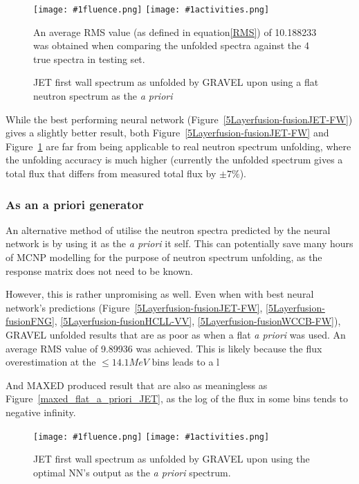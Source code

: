 \documentclass[a4paper, 12pt]{article}
\newcommand{\fluenceandactivities}[1]{
\texttt{[image: \#1fluence.png]}
\texttt{[image: \#1activities.png]}
}
\begin{document}
\begin{figure}
\centering
    \fluenceandactivities{/home/ocean/Documents/GitHubDir/unfolding/unfolding/unfoldingsuite/neuralnetwork/realinputEarlyStopping/comparison/real_fusion_test_gravel_test_001_}
    \caption{JET first wall spectrum as unfolded by GRAVEL upon using a flat neutron spectrum as the \emph{a priori}}\label{gravel_flat_a_priori_JET}
    An average RMS value (as defined in equation\ref{RMS}) of 10.188233 was obtained when comparing the unfolded spectra against the 4 true spectra in testing set.
\end{figure}

While the best performing neural network (Figure~\ref{5Layerfusion-fusionJET-FW}) gives a slightly better result, both Figure~\ref{5Layerfusion-fusionJET-FW} and Figure~\ref{gravel_flat_a_priori_JET} are far from being applicable to real neutron spectrum unfolding, where the unfolding accuracy is much higher (currently the unfolded spectrum gives a total flux that differs from measured total flux by $\pm 7\%$\cite{bethColling_TBMD}).

\subsubsection{As an a priori generator}
An alternative method of utilise the neutron spectra predicted by the neural network is by using it as the \emph{a priori} it self. This can potentially save many hours of MCNP modelling for the purpose of neutron spectrum unfolding, as the response matrix does not need to be known.

However, this is rather unpromising as well. Even when with best neural network's predictions (Figure~\ref{5Layerfusion-fusionJET-FW}, \ref{5Layerfusion-fusionFNG}, \ref{5Layerfusion-fusionHCLL-VV}, \ref{5Layerfusion-fusionWCCB-FW}), GRAVEL unfolded results that are as poor as when a flat \emph{a priori} was used. An average RMS value of 9.89936 was achieved. This is likely because the flux overestimation at the $\le 14.1MeV$ bins leads to a l

And MAXED produced result that are also as meaningless as Figure~\ref{maxed_flat_a_priori_JET}, as the log of the flux in some bins tends to negative infinity.

\begin{figure}
    \centering
    \fluenceandactivities{/home/ocean/Documents/GitHubDir/unfolding/unfolding/unfoldingsuite/neuralnetwork/realinputEarlyStopping/comparison/real_fusion_test_gravel_nn_a_priori_test_001_}
    \caption{JET first wall spectrum as unfolded by GRAVEL upon using the optimal NN's output as the \emph{a priori} spectrum.}\label{gravel_nn_a_priori_JET}
\end{figure}
\end{document}
